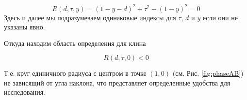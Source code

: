 \documentclass[a4paper]{article}
\begin{document}
\begin{equation} \label{GrindEQ__21_4} R\left(d,\tau,y\right)=(1-y-d)^2+\tau ^2-(1-y)^2=0 \end{equation}
Здесь и далее мы подразумеваем одинаковые индексы для $\tau$, $d$ и $y$ если они не указаны явно. 

Откуда находим область определения для клина

 \begin{equation} \label{GrindEQ__21_5} R\left(d,\tau,0\right)<0 \end{equation}




Т.е. круг единичного радиуса с центром в точке $(1,0)$ (см. Рис. \ref{fig:phaseAB}) не зависящий от угла наклона, что представляет определенные удобства для исследования. 

\end{document}
